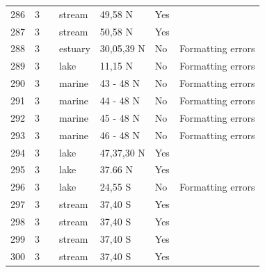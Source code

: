 \documentclass[12pt]{article}
\begin{document}
\begin{landscape}
\begin{table}[h!]
{\begin{tabular}{p{2.8cm}p{1.3cm}p{3cm}p{2.2cm}p{2.5cm}lp{8.2cm}}
        286   & 3 & \cite{Cromar1996}  & stream & 49,58 N & Yes   &       \\
        287   & 3 & \cite{Cromar1996}  & stream & 50,58 N & Yes   &       \\
        288   & 3 & \cite{Christian1999}    & estuary & 30,05,39 N & No  &  Formatting errors     \\
        289   & 3 & \cite{Fetahi2011}  & lake  & 11,15 N & No  &  Formatting errors     \\
        290   & 3 & \cite{Brodeur1992}    & marine & 43 - 48 N & No  &  Formatting errors     \\
        291   & 3 & \cite{Brodeur1992}    & marine & 44 - 48 N & No  &  Formatting errors     \\
        292   & 3 & \cite{Brodeur1992}    & marine & 45 - 48 N & No  &  Formatting errors     \\
        293   & 3 & \cite{Brodeur1992}    & marine & 46 - 48 N & No  &  Formatting errors     \\
        294   & 3 & \cite{Gaedke1994}  & lake  & 47,37,30 N & Yes   &       \\
        295   & 3 & \cite{Preston2012}    & lake  & 37.66 N & Yes   &        \\
        296   & 3 & \cite{Ratsirarson1996}  & lake  & 24,55 S & No  &  Formatting errors     \\
        297   & 3 & \cite{Closs1994}  & stream & 37,40 S & Yes   &       \\
        298   & 3 & \cite{Closs1994}  & stream & 37,40 S & Yes   &       \\
        299   & 3 & \cite{Closs1994}  & stream & 37,40 S & Yes   &       \\
        300   & 3 & \cite{Closs1994}  & stream & 37,40 S & Yes   &       \\
         \hline
      \end{tabular}}%
      \end{table}

        \newpage


\end{landscape}
\end{document}
